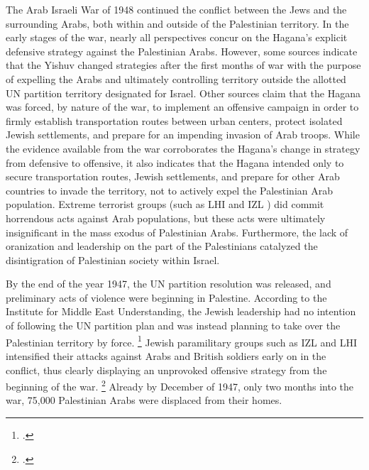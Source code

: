 \documentclass{turabian-researchpaper}
\begin{document}
The Arab Israeli War of 1948 continued the conflict between the Jews and the surrounding Arabs, both within and outside of the Palestinian territory.  In the early stages of the war, nearly all perspectives concur on the Hagana's explicit defensive strategy against the Palestinian Arabs.
However, some sources indicate that the Yishuv changed strategies after the first months of war with the purpose of expelling the Arabs and ultimately controlling territory outside the allotted UN partition territory designated for Israel.  Other sources claim that the Hagana was forced, by nature of the war, to implement an offensive campaign in order to firmly establish transportation routes between urban centers, protect isolated Jewish settlements, and prepare for an impending invasion of Arab troops.
While the evidence available from the war corroborates the Hagana's change in strategy from defensive to offensive, it also indicates that the Hagana intended only to secure transportation routes, Jewish settlements, and prepare for other Arab countries to invade the territory, not to actively expel the Palestinian Arab population.  Extreme terrorist groups (such as LHI and IZL ) did commit horrendous acts against Arab populations, but these acts were ultimately insignificant in the mass exodus of Palestinian Arabs.  Furthermore, the lack of oranization and leadership on the part of the Palestinians catalyzed the disintigration of Palestinian society within Israel.

By the end of the year 1947, the UN partition resolution was released, and preliminary acts of violence were beginning in Palestine.  According to the Institute for Middle East Understanding, the Jewish leadership had no intention of following the UN partition plan and was instead planning to take over the Palestinian territory by force.
\footcite{nabka}
Jewish paramilitary groups such as IZL and LHI intensified their attacks against Arabs and British soldiers early on in the conflict, thus clearly displaying an unprovoked offensive strategy from the beginning of the war.
\footcite{nabka}
Already by December of 1947, only two months into the war, 75,000 Palestinian Arabs were displaced from their homes.
\end{document}
